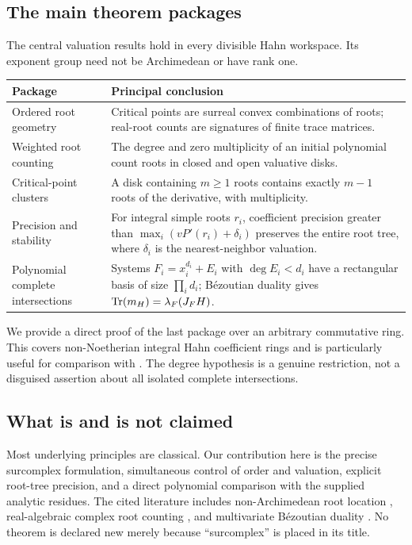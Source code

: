 \documentclass[11pt,letterpaper,oneside]{article}
\numberwithin{equation}{section}
\theoremstyle{definition}
\theoremstyle{remark}\newtheorem{remark}[theorem]{Remark}
\begin{document}
\subsection{The main theorem packages}
The central valuation results hold in every divisible Hahn workspace.
Its exponent group need not be Archimedean or have rank one.
\begin{center}\small
\begin{tabular}{@{}L{0.27\textwidth}L{0.61\textwidth}@{}}
\toprule
Package & Principal conclusion\\
\midrule
Ordered root geometry & Critical points are surreal convex combinations of
roots; real-root counts are signatures of finite trace matrices.\\[0.45em]
Weighted root counting & The degree and zero multiplicity of an initial
polynomial count roots in closed and open valuative disks.\\[0.45em]
Critical-point clusters & A disk containing $m\geq1$ roots contains exactly
$m-1$ roots of the derivative, with multiplicity.\\[0.45em]
Precision and stability & For integral simple roots $r_i$, coefficient
precision greater than $\max_i(vP'(r_i)+\delta_i)$ preserves the entire
root tree, where $\delta_i$ is the nearest-neighbor valuation.\\[0.45em]
Polynomial complete intersections & Systems $F_i=x_i^{d_i}+E_i$ with
$\deg E_i<d_i$ have a rectangular basis of size $\prod_i d_i$;
B\'ezoutian duality gives $\operatorname{Tr}(m_H)=\lambda_F(J_FH)$.\\
\bottomrule
\end{tabular}
\end{center}

We provide a direct proof of the last package over an arbitrary commutative
ring. This covers non-Noetherian integral Hahn coefficient rings and is
particularly useful for comparison with \cite{SourceResearch}. The degree
hypothesis is a genuine restriction, not a disguised assertion about all
isolated complete intersections.

\subsection{What is and is not claimed}
Most underlying principles are classical. Our contribution here is the
precise surcomplex formulation, simultaneous control of order and valuation,
explicit root-tree precision, and a direct polynomial comparison with the
supplied analytic residues. The cited literature includes non-Archimedean
root location \cite{ChoiLee}, real-algebraic complex root counting
\cite{Eisermann,Swan}, and multivariate B\'ezoutian duality
\cite{BCRS,BMP}. No theorem is declared new merely because ``surcomplex'' is
placed in its title.
\end{document}
